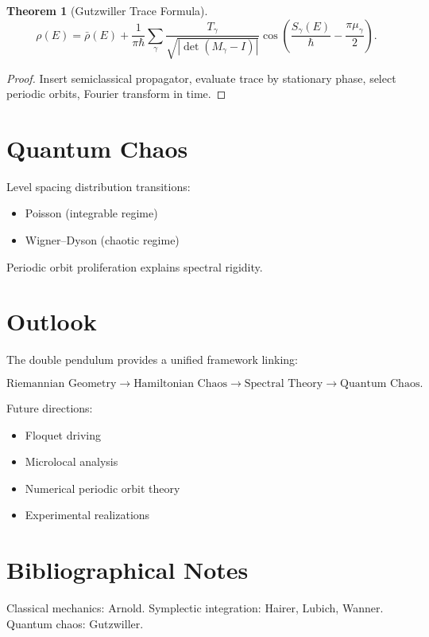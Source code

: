 \documentclass[11pt,oneside]{book}
\newtheorem{theorem}{Theorem}[chapter]
\begin{document}
\begin{theorem}[Gutzwiller Trace Formula]
\[
\rho(E)
=
\bar\rho(E)
+
\frac1{\pi\hbar}
\sum_\gamma
\frac{T_\gamma}
{\sqrt{|\det(M_\gamma-I)|}}
\cos\left(
\frac{S_\gamma(E)}{\hbar}
-
\frac{\pi\mu_\gamma}{2}
\right).
\]
\end{theorem}

\begin{proof}
Insert semiclassical propagator,
evaluate trace by stationary phase,
select periodic orbits,
Fourier transform in time.
\end{proof}

\chapter{Quantum Chaos}

Level spacing distribution transitions:

\begin{itemize}
\item Poisson (integrable regime)
\item Wigner--Dyson (chaotic regime)
\end{itemize}

Periodic orbit proliferation explains spectral rigidity.

\chapter{Outlook}

The double pendulum provides a unified framework linking:

\[
\text{Riemannian Geometry}
\rightarrow
\text{Hamiltonian Chaos}
\rightarrow
\text{Spectral Theory}
\rightarrow
\text{Quantum Chaos}.
\]

Future directions:

\begin{itemize}
\item Floquet driving
\item Microlocal analysis
\item Numerical periodic orbit theory
\item Experimental realizations
\end{itemize}

\backmatter

\chapter*{Bibliographical Notes}

Classical mechanics: Arnold.  
Symplectic integration: Hairer, Lubich, Wanner.  
Quantum chaos: Gutzwiller.  
\end{document}
